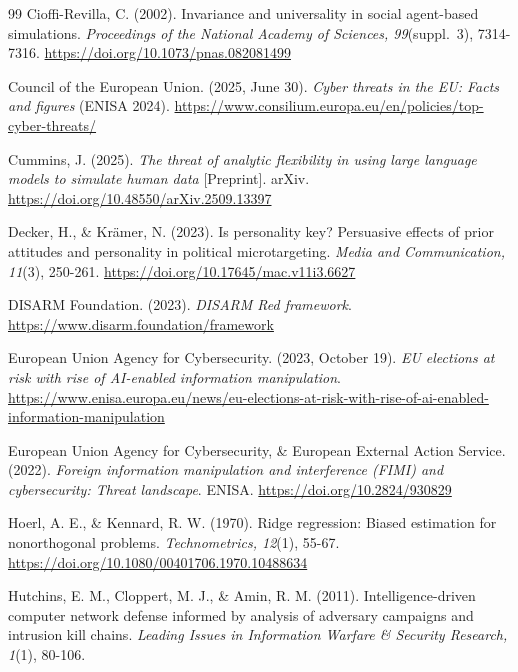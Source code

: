 \documentclass[11pt,a4paper]{article}
\newcommand{\doiurl}[1]{\href{https://doi.org/#1}{https://doi.org/#1}}
\begin{document}
\begin{thebibliography}{99}
Cioffi-Revilla, C. (2002). Invariance and universality in social agent-based simulations.
\textit{Proceedings of the National Academy of Sciences, 99}(suppl.\ 3), 7314-7316.
\doiurl{10.1073/pnas.082081499}

Council of the European Union. (2025, June 30). \textit{Cyber threats in the EU: Facts and figures}
(ENISA 2024). \url{https://www.consilium.europa.eu/en/policies/top-cyber-threats/}

Cummins, J. (2025). \textit{The threat of analytic flexibility in using large language models to
simulate human data} [Preprint]. arXiv. \doiurl{10.48550/arXiv.2509.13397}

Decker, H., \& Kr\"amer, N. (2023). Is personality key? Persuasive effects of prior attitudes and
personality in political microtargeting. \textit{Media and Communication, 11}(3), 250-261.
\doiurl{10.17645/mac.v11i3.6627}

DISARM Foundation. (2023). \textit{DISARM Red framework}.
\url{https://www.disarm.foundation/framework}

European Union Agency for Cybersecurity. (2023, October 19). \textit{EU elections at risk with rise
of AI-enabled information manipulation}.
\url{https://www.enisa.europa.eu/news/eu-elections-at-risk-with-rise-of-ai-enabled-information-manipulation}

European Union Agency for Cybersecurity, \& European External Action Service. (2022).
\textit{Foreign information manipulation and interference (FIMI) and cybersecurity: Threat
landscape}. ENISA. \doiurl{10.2824/930829}

Hoerl, A. E., \& Kennard, R. W. (1970). Ridge regression: Biased estimation for nonorthogonal
problems. \textit{Technometrics, 12}(1), 55-67. \doiurl{10.1080/00401706.1970.10488634}

Hutchins, E. M., Cloppert, M. J., \& Amin, R. M. (2011). Intelligence-driven computer network
defense informed by analysis of adversary campaigns and intrusion kill chains. \textit{Leading
Issues in Information Warfare \& Security Research, 1}(1), 80-106.


\end{thebibliography}
\end{document}
